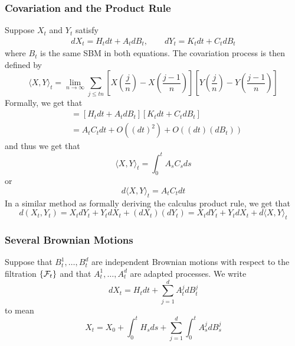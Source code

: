 \documentclass[oneside]{book}
\begin{document}
\subsubsection{Covariation and the Product Rule}
Suppose $X_t$ and $Y_t$ satisfy 
\begin{align}
    dX_t = H_tdt + A_t dB_t, \qquad dY_t = K_t dt + C_tdB_t
\end{align}
where $B_t$ is the same SBM in both equations. The covariation process is then defined by 
\[\langle X, Y \rangle_t = \lim\limits_{n\to \infty}\sum_{j\leq tn}\left[X(\frac{j}{n}) - X(\frac{j-1}{n})\right]\left[Y(\frac{j}{n}) - Y(\frac{j-1}{n})\right]\]
Formally, we get that 
\begin{align*}
    [dX_t][dY_t] &= [H_tdt + A_t dB_t][K_t dt + C_tdB_t]\\
    &= A_t C_t dt  + O((dt)^2) + O((dt)(dB_t))
\end{align*}
and thus we get that
\[\langle X, Y \rangle_t = \int_0^t A_s C_s ds\] or 
\[d\langle X, Y\rangle_t = A_t C_t dt\]
In a similar method as formally deriving the calculus product rule, we get that 
\[d(X_t, Y_t) = X_t dY_t + Y_t dX_t + (dX_t)(dY_t) =  X_t dY_t + Y_t dX_t + d\langle X, Y\rangle_t\]





\subsubsection{Several Brownian Motions}
Suppose that $B_t^1, \dots, B_t^d$ are independent Brownian motions with respect to the filtration $\{\mathcal{F}_t\}$ and that $A_t^1, \dots, A_t^d$ are adapted processes. We write
\[dX_t = H_t dt + \sum_{j=1}^d A_t^j dB_t^j\] to mean 
\[X_t = X_0 + \int_0^t H_s ds + \sum_{j=1}^d \int_0^t A_s^j dB_s^j\]
\end{document}
